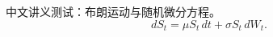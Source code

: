 \documentclass[11pt,a4paper,fontset=none]{ctexart}
\begin{document}
中文讲义测试：布朗运动与随机微分方程。\[dS_t=\mu S_t\,dt+\sigma S_t\,dW_t.\]
\end{document}
